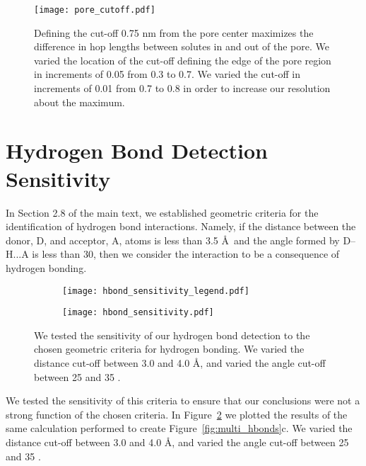   \begin{figure}[!h]
  \centering
  \texttt{[image: pore\_cutoff.pdf]}
  \caption{Defining the cut-off 0.75 nm from the pore center maximizes the 
  difference in hop lengths between solutes in and out of the pore. We 
  varied the location of the cut-off defining the edge of the pore region
  in increments of 0.05 from 0.3 to 0.7. We varied the cut-off in 
  increments of 0.01 from 0.7 to 0.8 in order to increase our resolution
  about the maximum.}\label{S-fig:pore_cutoff}
  \end{figure}

  \clearpage
  \section{Hydrogen Bond Detection Sensitivity}\label{S-section:hbond_sensitivity}
  
  In Section 2.8 of the main text, we established geometric criteria for the 
  identification of hydrogen bond interactions. Namely, if the distance between the donor,
  D, and acceptor, A, atoms is less than 3.5 \AA~and the angle formed by D--H...A is less
  than 30\degree, then we consider the interaction to be a consequence of hydrogen bonding.
  
  \begin{figure}[!htb]
  \centering
  \begin{subfigure}{\textwidth}
  \centering
  \texttt{[image: hbond\_sensitivity\_legend.pdf]}
  \end{subfigure}
  \begin{subfigure}{\textwidth}
  \texttt{[image: hbond\_sensitivity.pdf]}
  \end{subfigure}
  \caption{We tested the sensitivity of our hydrogen bond detection to the chosen 
  geometric criteria for hydrogen bonding. We varied the distance cut-off between 3.0 and
  4.0 \AA, and varied the angle cut-off between 25 and 35 \degree.}\label{S-fig:hbond_sensitivity}
  \end{figure}
  
  We tested the sensitivity of this criteria to ensure that our conclusions
  were not a strong function of the chosen criteria. In Figure~\ref{S-fig:hbond_sensitivity} we
  plotted the results of the same calculation performed to create Figure~\ref{fig:multi_hbonds}c.
  We varied the distance cut-off between 3.0 and 4.0 \AA, and varied the
  angle cut-off between 25 and 35 \degree. 
  
